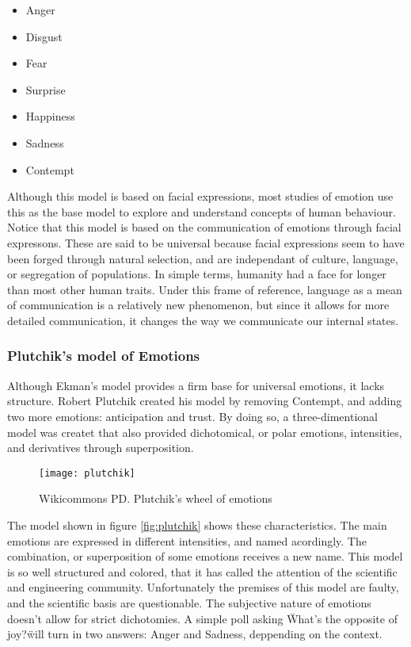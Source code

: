 \begin{itemize}
  \item Anger
  \item Disgust
  \item Fear
  \item Surprise
  \item Happiness
  \item Sadness
  \item Contempt
\end{itemize}

Although this model is based on facial expressions, most studies of emotion use this as the base model to explore and understand concepts of human behaviour. Notice that this model is based on the communication of emotions through facial expressons. These are said to be universal because facial expressions seem to have been forged through natural selection, and are independant of culture, language, or segregation of populations. In simple terms, humanity had a face for longer than most other human traits. Under this frame of reference, language as a mean of communication is a relatively new phenomenon, but since it allows for more detailed communication, it changes the way we communicate our internal states.

\subsubsection{Plutchik's model of Emotions}\label{subs:Plutchik's model of Emotions}
Although Ekman's model provides a firm base for universal emotions, it lacks structure. Robert Plutchik created his model by removing Contempt, and adding two more emotions: anticipation and trust. By doing so, a three-dimentional model was createt that also provided dichotomical, or polar emotions, intensities, and derivatives through superposition.

\begin{figure}[H]
  \texttt{[image: plutchik]}
  \centering
  \caption{Wikicommons PD. Plutchik's wheel of emotions}
\end{figure}\label{fig:plutchik}

The model shown in figure \ref{fig:plutchik} shows these characteristics. The main emotions are expressed in different intensities, and named acordingly. The combination, or superposition of some emotions receives a new name. This model is so well structured and colored, that it has called the attention of the scientific and engineering community. Unfortunately the premises of this model are faulty, and the scientific basis are questionable. The subjective nature of emotions doesn't allow for strict dichotomies. A simple poll asking \"What's the opposite of joy?\" will turn in two answers: Anger and Sadness, deppending on the context.

